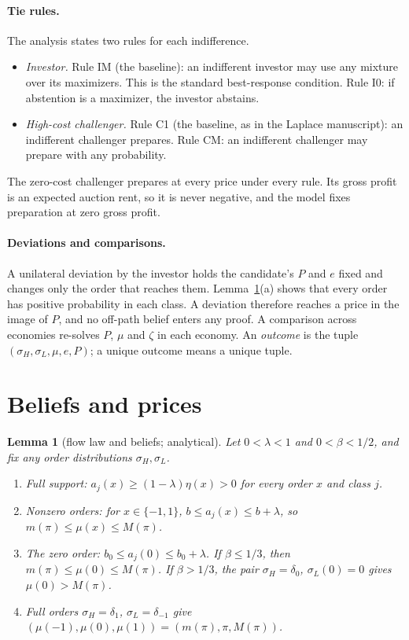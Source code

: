 \documentclass[11pt]{article}
\newtheorem{lemma}{Lemma}
\theoremstyle{definition}
\begin{document}
\paragraph{Tie rules.} The analysis states two rules for each indifference.
\begin{itemize}
\item \emph{Investor.} Rule IM (the baseline): an indifferent investor may use any mixture over its maximizers.
  This is the standard best-response condition. Rule I0: if abstention is a maximizer, the investor abstains.
\item \emph{High-cost challenger.} Rule C1 (the baseline, as in the Laplace manuscript): an indifferent
  challenger prepares. Rule CM: an indifferent challenger may prepare with any probability.
\end{itemize}
The zero-cost challenger prepares at every price under every rule. Its gross profit is an expected auction
rent, so it is never negative, and the model fixes preparation at zero gross profit.

\paragraph{Deviations and comparisons.} A unilateral deviation by the investor holds the candidate's $P$ and
$e$ fixed and changes only the order that reaches them. Lemma~\ref{lem:flow}(a) shows that every order has
positive probability in each class. A deviation therefore reaches a price in the image of $P$, and no
off-path belief enters any proof. A comparison across economies re-solves $P$, $\mu$ and $\zeta$ in each economy.
An \emph{outcome} is the tuple $(\sigma_H,\sigma_L,\mu,e,P)$; a unique outcome means a unique tuple.

\section{Beliefs and prices}\label{sec:beliefs}

\begin{lemma}[flow law and beliefs; analytical]\label{lem:flow}
Let $0<\lambda<1$ and $0<\beta<1/2$, and fix any order distributions $\sigma_H,\sigma_L$.
\begin{enumerate}[label=(\alph*)]
\item Full support: $a_j(x)\ge(1-\lambda)\eta(x)>0$ for every order $x$ and class $j$.
\item Nonzero orders: for $x\in\{-1,1\}$, $b\le a_j(x)\le b+\lambda$, so $m(\pi)\le\mu(x)\le M(\pi)$.
\item The zero order: $b_0\le a_j(0)\le b_0+\lambda$. If $\beta\le1/3$, then $m(\pi)\le\mu(0)\le M(\pi)$.
  If $\beta>1/3$, the pair $\sigma_H=\delta_0$, $\sigma_L(0)=0$ gives $\mu(0)>M(\pi)$.
\item Full orders $\sigma_H=\delta_1$, $\sigma_L=\delta_{-1}$ give $(\mu(-1),\mu(0),\mu(1))=(m(\pi),\pi,M(\pi))$.
\end{enumerate}
\end{lemma}
\end{document}
